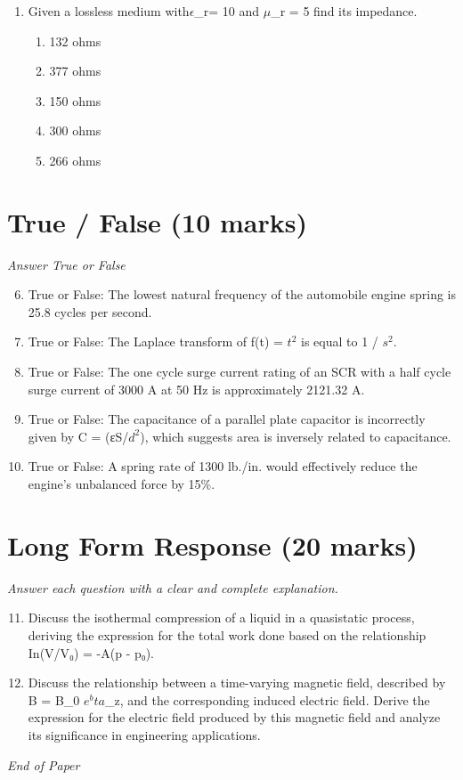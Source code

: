 \documentclass[12pt]{article}
\begin{document}
\begin{enumerate}[label=\arabic*.]
\begin{enumerate}[label=(\alph*)]
    \item 2 / $s^3$
    \item (2 / $s^2$) * e^-4 s
    \item 4 / $s^3$
    \item [(2 e^-4 s) / $s^4$]
\end{enumerate}
\item Given a lossless medium with\ensuremath{\epsilon}\_r= 10 and \ensuremath{\mu}\_r = 5 find its impedance.
\begin{enumerate}[label=(\alph*)]
    \item 132 ohms
    \item 377 ohms
    \item 150 ohms
    \item 300 ohms
    \item 266 ohms
\end{enumerate}
\end{enumerate}

\section*{True / False (10 marks)}
\textit{Answer True or False}
\begin{enumerate}[label=\arabic*.]
\setcounter{enumi}{5}
\item True or False: The lowest natural frequency of the automobile engine spring is 25.8 cycles per second.
\item True or False: The Laplace transform of f(t) = $t^2$ is equal to 1 / $s^2$.
\item True or False: The one cycle surge current rating of an SCR with a half cycle surge current of 3000 A at 50 Hz is approximately 2121.32 A.
\item True or False: The capacitance of a parallel plate capacitor is incorrectly given by C = (εS/$d^2$), which suggests area is inversely related to capacitance.
\item True or False: A spring rate of 1300 lb./in. would effectively reduce the engine's unbalanced force by 15\%.
\end{enumerate}

\section*{Long Form Response (20 marks)}
\textit{Answer each question with a clear and complete explanation.}
\begin{enumerate}[label=\arabic*.]
\setcounter{enumi}{10}
\item Discuss the isothermal compression of a liquid in a quasistatic process, deriving the expression for the total work done based on the relationship In(V/V₀) = -A(p - p₀).
\item Discuss the relationship between a time-varying magnetic field, described by B = B\_0 $e^bta$\_z, and the corresponding induced electric field. Derive the expression for the electric field produced by this magnetic field and analyze its significance in engineering applications.
\end{enumerate}

\vfill
\noindent\textit{End of Paper}
\end{document}

